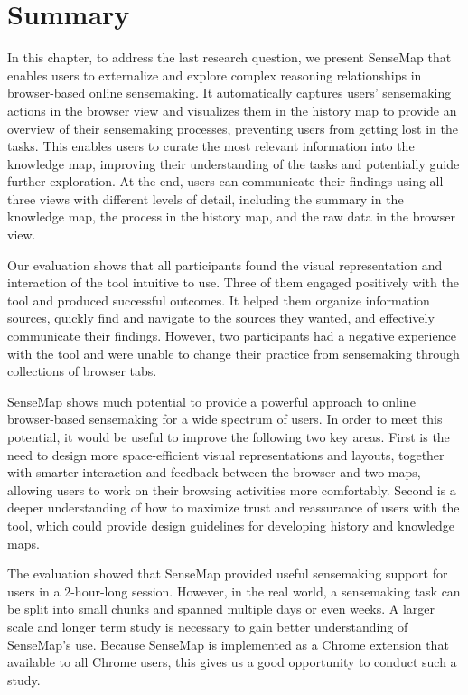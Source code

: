 \section{Summary}
In this chapter, to address the last research question, we present SenseMap that enables users to externalize and explore complex reasoning relationships in browser-based online sensemaking. It automatically captures users' sensemaking actions in the browser view and visualizes them in the history map to provide an overview of their sensemaking processes, preventing users from getting lost in the tasks. This enables users to curate the most relevant information into the knowledge map, improving their understanding of the tasks and potentially guide further exploration. At the end, users can communicate their findings using all three views with different levels of detail, including the summary in the knowledge map, the process in the history map, and the raw data in the browser view.

Our evaluation shows that all participants found the visual representation and interaction of the tool intuitive to use. Three of them engaged positively with the tool and produced successful outcomes. It helped them organize information sources, quickly find and navigate to the sources they wanted, and effectively communicate their findings. However, two participants had a negative experience with the tool and were unable to change their practice from sensemaking through collections of browser tabs.

SenseMap shows much potential to provide a powerful approach to online browser-based sensemaking for a wide spectrum of users. In order to meet this potential, it would be useful to improve the following two key areas. First is the need to design more space-efficient visual representations and layouts, together with smarter interaction and feedback between the browser and two maps, allowing users to work on their browsing activities more comfortably. Second is a deeper understanding of how to maximize trust and reassurance of users with the tool, which could provide design guidelines for developing history and knowledge maps.

The evaluation showed that SenseMap provided useful sensemaking support for users in a 2-hour-long session. However, in the real world, a sensemaking task can be split into small chunks and spanned multiple days or even weeks. A larger scale and longer term study is necessary to gain better understanding of SenseMap's use. Because SenseMap is implemented as a Chrome extension that available to all Chrome users, this gives us a good opportunity to conduct such a study.